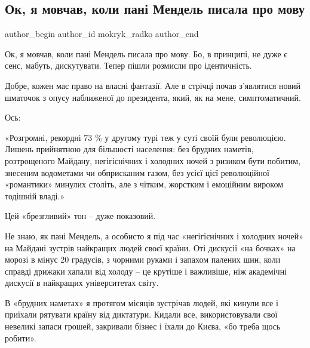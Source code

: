  
 
 
 
 
 
\subsection{Ок, я мовчав, коли пані Мендель писала про мову}
\label{sec:14_07_2021.fb.mokryk_radko.1.mendel_mova_maidan2014_foto}
 
\ifcmt
 author_begin
   author_id mokryk_radko
 author_end
\fi

Ок, я мовчав, коли пані Мендель писала про мову. Бо, в принципі, не дуже є
сенс, мабуть, дискутувати. Тепер пішли розмисли про ідентичність. 

Добре, кожен має право на власні фантазії. Але в стрічці почав з’являтися новий
шматочок з опусу наближеної до президента, який, як на мене, симптоматичний. 

Ось:  

«Розгромні, рекордні 73 \% у другому турі теж у суті своїй були революцією.
Лишень прийнятною для більшості населення: без брудних наметів, розтрощеного
Майдану, негігієнічних і холодних ночей з ризиком бути побитим, знесеним
водометами чи обприсканим газом, без усієї цієї революційної «романтики»
минулих століть, але з чітким, жорстким і емоційним вироком тодішній владі.»

Цей «брезгливий» тон – дуже показовий.

Не знаю, як пані Мендель, а особисто я під час «негігієнічних і холодних ночей»
на Майдані зустрів найкращих людей своєї країни. Оті дискусії «на бочках» на
морозі в мінус 20 градусів, з чорними руками і запахом палених шин, коли
справді дрижаки хапали від холоду – це крутіше і важливіше, ніж академічні
дискусії в найкращих університетах світу.

В «брудних наметах» я протягом місяців зустрічав людей, які кинули все і
приїхали рятувати країну від диктатури. Кидали все, використовували свої
невеликі запаси грошей, закривали бізнес і їхали до Києва, «бо треба щось
робити».

